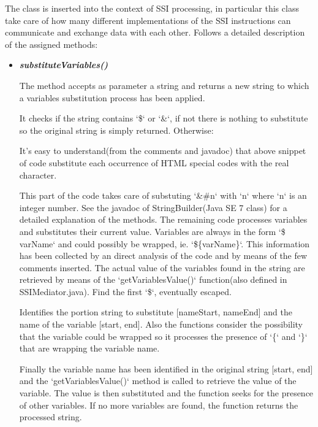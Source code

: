 \documentclass[11pt,titlepage]{article} %
\begin{document}
  The class is inserted into the context of SSI processing, in particular this class take care of
  how many different implementations of the SSI instructions can communicate and exchange data with each other.\newline
  Follows a detailed description of the assigned methods:
  \begin{itemize}
   \item \textbf{\textit{substituteVariables()}}
    
    The method accepts as parameter a string and returns a new string to which a variables substitution process has been applied.
    
    It checks if the string contains `\$` or `\&`, if not there is nothing to substitute so the original string is simply returned.
    Otherwise: 
    
    It's easy to understand(from the comments and javadoc) that above snippet of code substitute each occurrence of HTML special codes with the real character. \newline
    
    This part of the code takes care of substuting `\&\#n` with `n` where `n` is an integer number.
    See the javadoc of StringBuilder(Java SE 7 class) for a detailed explanation of the methods.\newline
    The remaining code processes variables and substitutes their current value.\newline
    Variables are always in the form `\$ varName` and could possibly be wrapped, ie. `\$\{varName\}`. 
    This information has been collected by an direct analysis of the code and by means of the few comments inserted. 
    The actual value of the variables found in the string are retrieved by means of the `getVariablesValue()` function(also defined in SSIMediator.java).\newline
    Find the first `\$`, eventually escaped.
    
    Identifies the portion string to substitute [nameStart, nameEnd] and the name of the variable [start, end].
    Also the functions consider the possibility that the variable could be wrapped so it processes the presence of `\{` and `\}` that
    are wrapping the variable name.
    
    Finally the variable name has been identified in the original string [start, end] and the `getVariablesValue()` method is called
    to retrieve the value of the variable. The value is then substituted and the function seeks for the presence of other variables.
    If no more variables are found, the function returns the processed string.
    


  \end{itemize}
\end{document}
